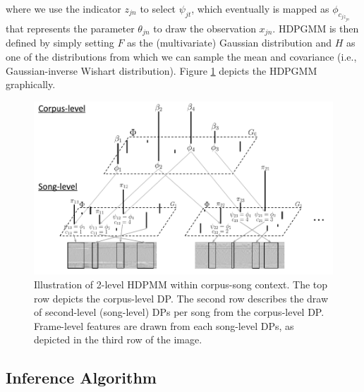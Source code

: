 \documentclass{article}
\begin{document}
where we use the indicator $z_{jn}$ to select $\psi_{jt}$, which eventually is mapped as $\phi_{c_{jz_{jn}}}$ that represents the parameter $\theta_{jn}$ to draw the observation $x_{jn}$. HDPGMM is then defined by simply setting $F$ as the (multivariate) Gaussian distribution and $H$ as one of the distributions from which we can sample the mean and covariance (i.e., Gaussian-inverse Wishart distribution). Figure \ref{fig:hdpmm} depicts the HDPGMM graphically.
\begin{figure}[ht]
    \centering
    \includegraphics[width=\linewidth]{figs/HDP-stick-breaking.pdf}
    \caption{Illustration of 2-level HDPMM within corpus-song context. The top row depicts the corpus-level DP. The second row describes the draw of second-level (song-level) DPs per song from the corpus-level DP. Frame-level features are drawn from each song-level DPs, as depicted in the third row of the image.}
    \label{fig:hdpmm}
\end{figure}


\subsection{Inference Algorithm}\label{sec:hdpgmm:inference}
\end{document}
